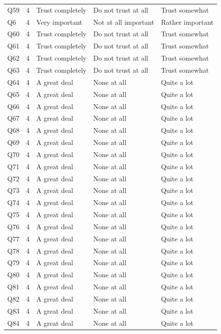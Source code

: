 \begin{longtable}{l r l l l}
Q59 & 4 & Trust completely & Do not trust at all & Trust somewhat \\
Q6 & 4 & Very important & Not at all important & Rather important \\
Q60 & 4 & Trust completely & Do not trust at all & Trust somewhat \\
Q61 & 4 & Trust completely & Do not trust at all & Trust somewhat \\
Q62 & 4 & Trust completely & Do not trust at all & Trust somewhat \\
Q63 & 4 & Trust completely & Do not trust at all & Trust somewhat \\
Q64 & 4 & A great deal & None at all & Quite a lot \\
Q65 & 4 & A great deal & None at all & Quite a lot \\
Q66 & 4 & A great deal & None at all & Quite a lot \\
Q67 & 4 & A great deal & None at all & Quite a lot \\
Q68 & 4 & A great deal & None at all & Quite a lot \\
Q69 & 4 & A great deal & None at all & Quite a lot \\
Q70 & 4 & A great deal & None at all & Quite a lot \\
Q71 & 4 & A great deal & None at all & Quite a lot \\
Q72 & 4 & A great deal & None at all & Quite a lot \\
Q73 & 4 & A great deal & None at all & Quite a lot \\
Q74 & 4 & A great deal & None at all & Quite a lot \\
Q75 & 4 & A great deal & None at all & Quite a lot \\
Q76 & 4 & A great deal & None at all & Quite a lot \\
Q77 & 4 & A great deal & None at all & Quite a lot \\
Q78 & 4 & A great deal & None at all & Quite a lot \\
Q79 & 4 & A great deal & None at all & Quite a lot \\
Q80 & 4 & A great deal & None at all & Quite a lot \\
Q81 & 4 & A great deal & None at all & Quite a lot \\
Q82 & 4 & A great deal & None at all & Quite a lot \\
Q83 & 4 & A great deal & None at all & Quite a lot \\
Q84 & 4 & A great deal & None at all & Quite a lot \\

\end{longtable}
